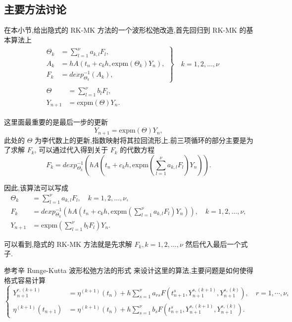 \subsection{主要方法讨论}

在本小节,给出隐式的 RK-MK 方法的一个波形松弛改造,首先回归到 RK-MK 的基本算法上
\begin{equation*}
	\begin{aligned}
		&\left.\begin{aligned}
		\Theta_k&=\sum_{l=1}^{\nu}a_{k,l}F_l,\\
		A_k&=hA(t_n+c_kh,\mbox{expm}(\Theta_k)Y_n),\\
		F_k&=dexp_{\Theta_k}^{-1}(A_k),
	\end{aligned}\right\rbrace \quad k=1,2,\ldots,\nu\\
		&\begin{aligned}
		\Theta&=\sum_{l=1}^{\nu}b_lF_l,\\
		Y_{n+1}&=\mbox{expm}(\Theta)Y_n.
	\end{aligned}
	\end{aligned}
\end{equation*}

这里面最重要的是最后一步的更新
\begin{equation*}
	Y_{n+1}=\mbox{expm}(\Theta)Y_n,
\end{equation*}
此处的 $\Theta$ 为李代数上的更新,指数映射将其拉回流形上.前三项循环的部分主要是为了求解 $F_k$, 可以通过代入得到关于 $F_k$ 的代数方程
\begin{equation*}
	F_k=dexp_{\Theta_k}^{-1}(hA(t_n+c_kh,\mbox{expm}(\sum_{l=1}^{\nu}a_{k,l}F_l)Y_n)).
\end{equation*}

因此,该算法可以写成
\begin{equation*}
	\begin{aligned}
		\Theta_k&=\sum_{l=1}^{\nu}a_{k,l}F_l,\quad k=1,2,\ldots,\nu,\\
		F_k&=dexp_{\Theta_k}^{-1}(hA(t_n+c_kh,\mbox{expm}(\sum_{l=1}^{\nu}a_{k,l}F_l)Y_n)),\quad k=1,2,\ldots,\nu,\\
		Y_{n+1}&=\mbox{expm}(\sum_{l=1}^{\nu}b_lF_l)Y_n.
	\end{aligned}
\end{equation*}

可以看到,隐式的 RK-MK 方法就是先求解 $F_k,k=1,2,\ldots,\nu$ 然后代入最后一个式子.

参考辛 Runge-Kutta 波形松弛方法的形式 \cite{bellen1993use} 来设计这里的算法,主要问题是如何使得格式容易计算
\begin{equation*}
  \left\lbrace
    \begin{aligned}
      Y_{n+1}^{r,(k+1)}&=\eta^{(k+1)}(t_{n})+h\sum_{s=1}^{\nu}a_{rs}F(t_{n+1}^{s},Y_{n+1}^{s,(k+1)},Y_{n+1}^{s,(k)}),\quad r=1,\cdots, \nu, \\
      \eta^{(k+1)}(t_{n+1})&=\eta^{(k+1)}(t_{n})+h\sum_{s=1}^{\nu}b_{s}F(t_{n+1}^{s},Y_{n+1}^{s,(k+1)},Y_{n+1}^{s,(k)}).
    \end{aligned}
  \right.
\end{equation*}

